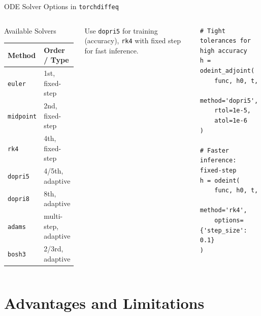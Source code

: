 \documentclass[aspectratio=169,xcolor=dvipsnames,svgnames,x11names,fleqn]{beamer}
\begin{document}
\begin{frame}[fragile]{ODE Solver Options in \texttt{torchdiffeq}}
\scriptsize

\begin{columns}
\begin{tblockFrost}{Available Solvers}
\begin{tabular}{ll}
\toprule
\textbf{Method} & \textbf{Order / Type}\\
\midrule
\texttt{euler}    & 1st, fixed-step\\
\texttt{midpoint} & 2nd, fixed-step\\
\texttt{rk4}      & 4th, fixed-step\\
\texttt{dopri5}   & 4/5th, adaptive\\
\texttt{dopri8}   & 8th, adaptive\\
\texttt{adams}    & multi-step, adaptive\\
\texttt{bosh3}    & 2/3rd, adaptive\\
\bottomrule
\end{tabular}
\end{tblockFrost}

\begin{alertblock}{}
Use \texttt{dopri5} for training (accuracy), \texttt{rk4} with fixed step for fast inference.
\end{alertblock}

\begin{MintedFrame}
\begin{verbatim}
# Tight tolerances for high accuracy
h = odeint_adjoint(
    func, h0, t,
    method='dopri5',
    rtol=1e-5,
    atol=1e-6
)
 
# Faster inference: fixed-step
h = odeint(
    func, h0, t,
    method='rk4',
    options={'step_size': 0.1}
)
\end{verbatim}
\end{MintedFrame}

\end{columns}
\end{frame}
 
\section{Advantages and Limitations}
 
\end{document}
